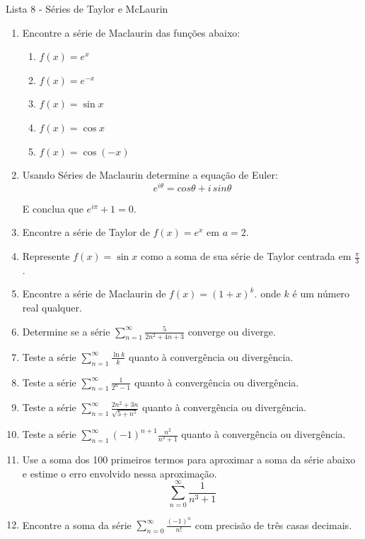 \documentclass[11pt,a4paper]{article}
\newcommand{\integral}{\displaystyle\int}
\newcommand{\somatorio}{\displaystyle\sum}
\begin{document}
	\begin{center}
		\Large Lista 8 - Séries de Taylor e McLaurin
	\end{center}

	\begin{enumerate}
	
		\item Encontre a série de Maclaurin das funções abaixo:
		\begin{enumerate}
			\item $f(x) = e^x$
			\item $f(x) = e^{-x}$
			\item $f(x) = \sin x$
			\item $f(x) = \cos x$
			\item $f(x) = \cos (-x)$
		\end{enumerate}
	
	\item Usando Séries de Maclaurin determine a equação de Euler:
		$$e^{i\theta} = cos\theta + i \, sin\theta$$
		
		E conclua que $e^{i \pi} + 1 = 0$.
	
	\item Encontre a série de Taylor de $f(x) = e^x$ em $a = 2$.	
	
	\item Represente $f(x) = \sin x$ como a soma de sua série de Taylor centrada em $\displaystyle\frac{\pi}{3}$.
	
	\item Encontre a série de Maclaurin de $f(x) = (1 + x)^k$. onde $k$ é um número real qualquer.
	
	\item Determine se a série $\somatorio_{n=1}^{\infty} \displaystyle\frac{5}{2n^2 + 4n + 3} $ converge ou diverge.
	
	\item Teste a série $\somatorio_{n=1}^{\infty} \displaystyle\frac{\ln k}{k}$ quanto à convergência ou divergência.	
	
	\item Teste a série $\somatorio_{n=1}^{\infty} \displaystyle\frac{1}{2^n - 1}$ quanto à convergência ou divergência.
	
	\item Teste a série $\somatorio_{n=1}^{\infty} \displaystyle\frac{2n^2 + 3n}{\sqrt{5 + n^5}}$ quanto à convergência ou divergência.
	
	\item Teste a série $\somatorio_{n=1}^{\infty} (-1)^{n + 1} \displaystyle\frac{n^2}{n^3 + 1}$ quanto à convergência ou divergência.	
	
	\item Use a soma dos 100 primeiros termos para aproximar a soma da série abaixo e estime o erro envolvido nessa aproximação.
	$$\somatorio_{n=0}^{\infty} \displaystyle\frac{1}{n^3 + 1}$$ 
	
	\item Encontre a soma da série $\somatorio_{n=0}^{\infty} \displaystyle\frac{(-1)^n}{n!}$ com precisão de três casas decimais. 
	
	
	\end{enumerate}
	
\end{document}
